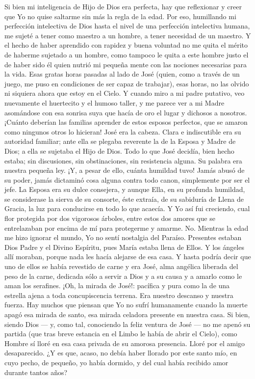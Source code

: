 \documentclass[12pt]{book} %
\begin{document}
Si bien mi inteligencia de Hijo de Dios era perfecta, hay que reflexionar y creer que Yo no quise saltarme sin más la regla 
de la edad.  Por eso, humillando mi perfección intelectiva de Dios hasta el nivel de una perfección intelectiva humana, me sujeté a tener como maestro a un hombre, a tener necesidad de un maestro. Y el hecho de haber aprendido con rapidez y buena voluntad no me quita el mérito de haberme sujetado a un hombre, como tampoco le quita a este hombre justo el de haber sido él quien nutrió mi pequeña mente con las nociones necesarias para la vida. 
Esas gratas horas pasadas al lado de José (quien, como a través de un juego, me puso en condiciones de ser capaz de 
trabajar), esas horas, no las olvido ni siquiera ahora que estoy en el Cielo. Y cuando miro a mi padre putativo, veo nuevamente el huertecito y el humoso taller, y me parece ver a mi Madre asomándose con esa sonrisa suya que hacía de oro el lugar y dichosos a nosotros. 
¡Cuánto deberían las familias aprender de estos esposos perfectos, que se amaron como ningunos otros lo hicieran! 
José era la cabeza. Clara e indiscutible era su autoridad familiar; ante ella se plegaba reverente la de la Esposa y Madre 
de Dios; a ella se sujetaba el Hijo de Dios. Todo lo que José decidía, bien hecho estaba; sin discusiones, sin obstinaciones, sin resistencia alguna. Su palabra era nuestra pequeña ley. ¡Y, a pesar de ello, cuánta humildad tuvo! Jamás abusó de su poder, jamás dictaminó cosa alguna contra todo canon, simplemente por ser el jefe. La Esposa era su dulce consejera, y aunque Ella, en su profunda humildad, se considerase la sierva de su consorte, éste extraía, de su sabiduría de Llena de Gracia, la luz para conducirse en todo lo que acaecía. 
Y Yo así fui creciendo, cual flor protegida por dos vigorosos árboles, entre estos dos amores que se entrelazaban por encima de mí para protegerme y amarme. 
No. Mientras la edad me hizo ignorar el mundo, Yo no sentí nostalgia del Paraíso. Presentes estaban Dios Padre y el Divino Espíritu, pues María estaba llena de Ellos. Y los ángeles allí moraban, porque nada les hacía alejarse de esa casa. Y hasta podría decir que uno de ellos se había revestido de carne y era José, alma angélica liberada del peso de la carne, dedicada sólo a servir a Dios y a su causa y a amarlo como le aman los serafines. ¡Oh, la mirada de José!: pacífica y pura como la de una estrella ajena a toda concupiscencia terrena. Era nuestro descanso y nuestra fuerza. 
Hay muchos que piensan que Yo no sufrí humanamente cuando la muerte apagó esa mirada de santo, esa mirada 
celadora presente en nuestra casa. Si bien, siendo Dios — y, como tal, conociendo la feliz ventura de José — no me apenó su partida (que tras breve estancia en el Limbo le había de abrir el Cielo), como Hombre sí lloré en esa casa privada de su amorosa presencia. Lloré por el amigo desaparecido. ¿Y es que, acaso, no debía haber llorado por este santo mío, en cuyo pecho, de pequeño, yo había dormido, y del cual había recibido amor durante tantos años? 
\end{document}
